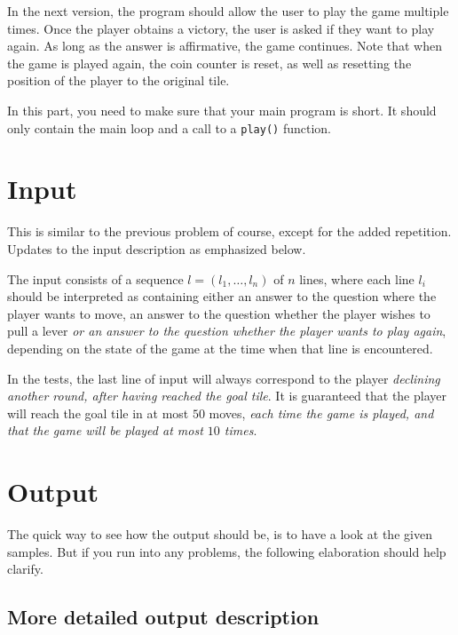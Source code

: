 
In the next version, the program should allow the user to play the game multiple times.
Once the player obtains a victory, the user is asked if they want to play again.
As long as the answer is affirmative, the game continues.
Note that when the game is played again, the coin counter is reset,
as well as resetting the position of the player to the original tile.

In this part, you need to make sure that your main program is short.
It should only contain the main loop and a call to a \texttt{play()} function.

\section*{Input}

This is similar to the previous problem of course,
except for the added repetition.
Updates to the input description as emphasized below.

The input consists of a sequence $l = (l_1, \dots, l_n)$ of $n$ lines,
where each line $l_i$ should be interpreted as containing
either an answer to the question where the player wants to move,
an answer to the question whether the player wishes to pull a lever
\emph{or an answer to the question whether the player wants to play again},
depending on the state of the game at the time when that line is encountered.

In the tests, the last line of input will always correspond to
the player \emph{declining another round, after having reached the goal tile}.
It is guaranteed that the player will reach the goal tile
in at most $50$ moves,
\emph{each time the game is played,
and that the game will be played at most $10$ times}.

\section*{Output}

The quick way to see how the output should be,
is to have a look at the given samples.
But if you run into any problems,
the following elaboration should help clarify.

\subsection*{More detailed output description}

